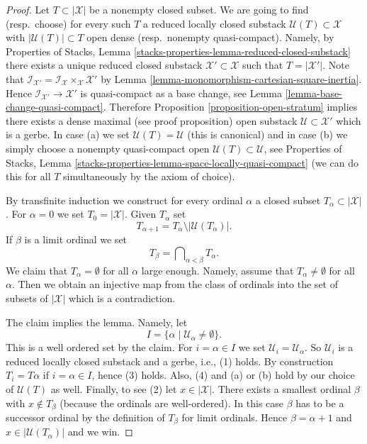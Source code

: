\begin{proof}
Let $T \subset |\mathcal{X}|$ be a nonempty closed subset. We are going
to find (resp.\ choose) for every such $T$ a reduced locally closed substack
$\mathcal{U}(T) \subset \mathcal{X}$ with $|\mathcal{U}(T)| \subset T$
open dense (resp.\ nonempty quasi-compact). Namely, by
Properties of Stacks, Lemma
\ref{stacks-properties-lemma-reduced-closed-substack}
there exists a unique reduced closed substack
$\mathcal{X}' \subset \mathcal{X}$ such that $T = |\mathcal{X}'|$.
Note that $\mathcal{I}_{\mathcal{X}'} =
\mathcal{I}_\mathcal{X} \times_\mathcal{X} \mathcal{X}'$ by
Lemma \ref{lemma-monomorphism-cartesian-square-inertia}.
Hence $\mathcal{I}_{\mathcal{X}'} \to \mathcal{X}'$ is
quasi-compact as a base change, see
Lemma \ref{lemma-base-change-quasi-compact}.
Therefore
Proposition \ref{proposition-open-stratum}
implies there exists a dense maximal (see proof proposition)
open substack $\mathcal{U} \subset \mathcal{X}'$
which is a gerbe. In case (a) we set $\mathcal{U}(T) = \mathcal{U}$
(this is canonical) and in case (b) we simply choose a nonempty quasi-compact
open $\mathcal{U}(T) \subset \mathcal{U}$, see
Properties of Stacks, Lemma
\ref{stacks-properties-lemma-space-locally-quasi-compact}
(we can do this for all $T$
simultaneously by the axiom of choice).

\medskip\noindent
By transfinite induction we construct for every ordinal $\alpha$ a
closed subset $T_\alpha \subset |\mathcal{X}|$. For $\alpha = 0$
we set $T_0 = |\mathcal{X}|$. Given $T_\alpha$ set
$$
T_{\alpha + 1} = T_\alpha \setminus |\mathcal{U}(T_\alpha)|.
$$
If $\beta$ is a limit ordinal we set
$$
T_\beta = \bigcap\nolimits_{\alpha < \beta} T_\alpha.
$$
We claim that $T_\alpha = \emptyset$ for all $\alpha$
large enough. Namely, assume that $T_\alpha \not = \emptyset$
for all $\alpha$. Then we obtain an injective map from the class
of ordinals into the set of subsets of $|\mathcal{X}|$ which is a
contradiction.

\medskip\noindent
The claim implies the lemma. Namely, let
$$
I = \{\alpha \mid \mathcal{U}_\alpha \not = \emptyset \}.
$$
This is a well ordered set by the claim. For $i = \alpha \in I$ we set
$\mathcal{U}_i = \mathcal{U}_\alpha$. So $\mathcal{U}_i$ is a reduced
locally closed substack and a gerbe, i.e., (1) holds. By construction
$T_i = T\alpha$ if $i = \alpha \in I$, hence (3) holds. Also, (4) and
(a) or (b) hold by our choice of $\mathcal{U}(T)$ as well. Finally, to see
(2) let $x \in |\mathcal{X}|$. There exists a smallest ordinal $\beta$
with $x \not \in T_\beta$ (because the ordinals are well-ordered).
In this case $\beta$ has to be a successor ordinal by the definition
of $T_\beta$ for limit ordinals. Hence $\beta = \alpha + 1$ and
$x \in |\mathcal{U}(T_\alpha)|$ and we win.
\end{proof}

